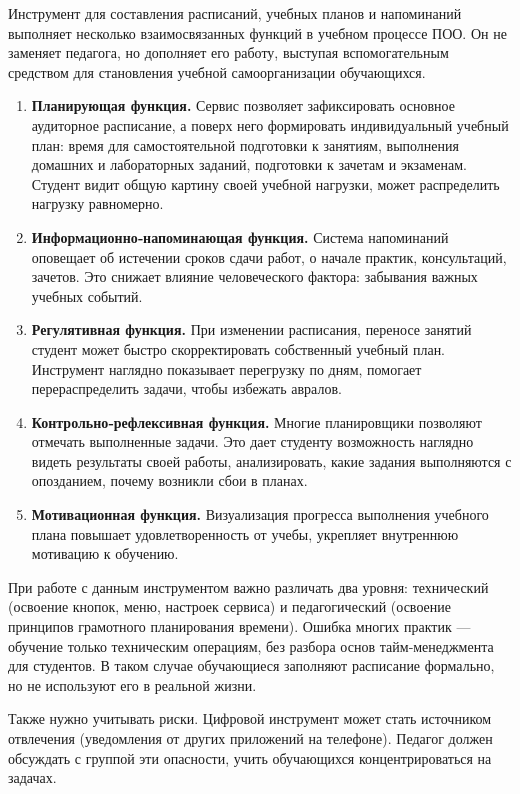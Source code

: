 \documentclass[14pt,a4paper]{article}
\begin{document}
Инструмент для составления расписаний, учебных планов и напоминаний выполняет несколько взаимосвязанных функций в учебном процессе ПОО. Он не заменяет педагога, но дополняет его работу, выступая вспомогательным средством для становления учебной самоорганизации обучающихся.
\begin{enumerate}
    \item \textbf{Планирующая функция.} Сервис позволяет зафиксировать основное аудиторное расписание, а поверх него формировать индивидуальный учебный план: время для самостоятельной подготовки к занятиям, выполнения домашних и лабораторных заданий, подготовки к зачетам и экзаменам. Студент видит общую картину своей учебной нагрузки, может распределить нагрузку равномерно.
    \item \textbf{Информационно‑напоминающая функция.} Система напоминаний оповещает об истечении сроков сдачи работ, о начале практик, консультаций, зачетов. Это снижает влияние человеческого фактора: забывания важных учебных событий.
    \item \textbf{Регулятивная функция.} При изменении расписания, переносе занятий студент может быстро скорректировать собственный учебный план. Инструмент наглядно показывает перегрузку по дням, помогает перераспределить задачи, чтобы избежать авралов.
    \item \textbf{Контрольно‑рефлексивная функция.} Многие планировщики позволяют отмечать выполненные задачи. Это дает студенту возможность наглядно видеть результаты своей работы, анализировать, какие задания выполняются с опозданием, почему возникли сбои в планах.
    \item \textbf{Мотивационная функция.} Визуализация прогресса выполнения учебного плана повышает удовлетворенность от учебы, укрепляет внутреннюю мотивацию к обучению.
\end{enumerate}

При работе с данным инструментом важно различать два уровня: технический (освоение кнопок, меню, настроек сервиса) и педагогический (освоение принципов грамотного планирования времени). Ошибка многих практик — обучение только техническим операциям, без разбора основ тайм‑менеджмента для студентов. В таком случае обучающиеся заполняют расписание формально, но не используют его в реальной жизни.

Также нужно учитывать риски. Цифровой инструмент может стать источником отвлечения (уведомления от других приложений на телефоне). Педагог должен обсуждать с группой эти опасности, учить обучающихся концентрироваться на задачах.
\end{document}
